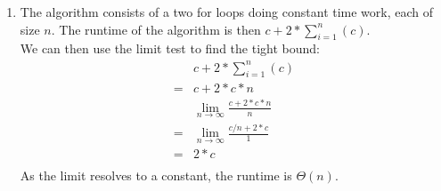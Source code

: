 \documentclass{assignment}
\begin{document}
\begin{problemlist}
\begin{answer}
\begin{enumerate}
\DecMargin{3em}
\item
The algorithm consists of a two for loops doing constant time work, each of size $n$.
The runtime of the algorithm is then $c + 2*\sum_{i=1}^n(c)$.\\
We can then use the limit test to find the tight bound:
\begin{align*}
&c + 2*\sum_{i=1}^n(c)\\
=&c + 2*c*n\\
&\lim_{n\rightarrow \infty} \frac{c + 2*c*n}{n}\\
=&\lim_{n\rightarrow \infty} \frac{c/n + 2*c}{1}\\
=&2*c\\
\end{align*}
As the limit resolves to a constant, the runtime is $\Theta (n)$.\\
\end{enumerate}
\end{answer}


\end{problemlist}
\end{document}
